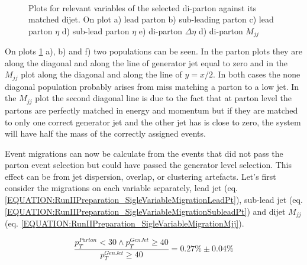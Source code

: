 \begin{figure}[!htp]
\\
\caption[]{Plots for relevant variables of the selected di-parton against its matched dijet. On plot a) lead parton \pt b) sub-leading parton \pt c) lead parton $\eta$ d) sub-lead parton $\eta$ e) di-parton $\Delta\eta$ d) di-parton $M_{jj}$}
\label{FIGURE:RunIIPreparation_VariablesPartonVsGenJet}
\end{figure}

On plots \ref{FIGURE:RunIIPreparation_VariablesPartonVsGenJet} a), b) and f) two populations can be seen. In the parton \pt plots they are along the diagonal and along the line of generator jet \pt equal to zero and in the $M_{jj}$ plot along the diagonal and along the line of $y=x/2$. In both cases the none diagonal population probably arises from miss matching a parton to a low \pt jet. In the $M_{jj}$ plot the second diagonal line is due to the fact that at parton level the partons are perfectly matched in energy and momentum but if they are matched to only one correct generator jet and the other jet has \pt is close to zero, the system will have half the mass of the correctly assigned events.

Event migrations can now be calculate from the events that did not pass the parton event selection but could have passed the generator level selection. This effect can be from jet dispersion, overlap, or clustering artefacts. Let's first consider the migrations on each variable separately, lead jet \pt (eq. \ref{EQUATION:RunIIPreparation_SigleVariableMigrationLeadPt}), sub-lead jet \pt (eq. \ref{EQUATION:RunIIPreparation_SigleVariableMigrationSubleadPt}) and dijet $M_{jj}$ (eq. \ref{EQUATION:RunIIPreparation_SigleVariableMigrationMjj}).

\small
\begin{equation}
\label{EQUATION:RunIIPreparation_SigleVariableMigrationLeadPt}
\frac{p_{T}^{Parton}<30 \wedge p_{T}^{GenJet} \geq 40}{p_{T}^{GenJet} \geq 40}=0.27\% \pm 0.04\%
\end{equation}

